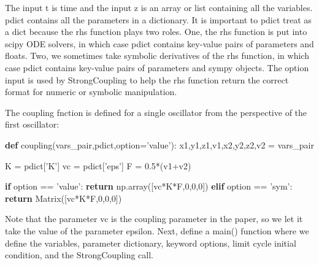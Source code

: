 \documentclass[
  english,
  a4paper,
  oneside]{article}
\newenvironment{Shaded}{}{}
\newcommand{\ControlFlowTok}[1]{\textcolor[rgb]{0.00,0.44,0.13}{\textbf{#1}}}
\newcommand{\DecValTok}[1]{\textcolor[rgb]{0.25,0.63,0.44}{#1}}
\newcommand{\FloatTok}[1]{\textcolor[rgb]{0.25,0.63,0.44}{#1}}
\newcommand{\KeywordTok}[1]{\textcolor[rgb]{0.00,0.44,0.13}{\textbf{#1}}}
\newcommand{\NormalTok}[1]{#1}
\newcommand{\OperatorTok}[1]{\textcolor[rgb]{0.40,0.40,0.40}{#1}}
\newcommand{\StringTok}[1]{\textcolor[rgb]{0.25,0.44,0.63}{#1}}
\begin{document}
The input t is time and the input z is an array or list containing all
the variables. pdict contains all the parameters in a dictionary. It is
important to pdict treat as a dict because the rhs function plays two
roles. One, the rhs function is put into scipy ODE solvers, in which
case pdict contains key-value pairs of parameters and floats. Two, we
sometimes take symbolic derivatives of the rhs function, in which case
pdict contains key-value pairs of parameters and sympy objects. The
option input is used by StrongCoupling to help the rhs function return
the correct format for numeric or symbolic manipulation.

The coupling fnction is defined for a single oscillator from the
perspective of the first oscillator:

\begin{Shaded}
\begin{Highlighting}[]
\KeywordTok{def}\NormalTok{ coupling(vars_pair,pdict,option}\OperatorTok{=}\StringTok{'value'}\NormalTok{):}
\NormalTok{    x1,y1,z1,v1,x2,y2,z2,v2 }\OperatorTok{=}\NormalTok{ vars_pair}
    
\NormalTok{    K }\OperatorTok{=}\NormalTok{ pdict[}\StringTok{'K'}\NormalTok{]}
\NormalTok{    vc }\OperatorTok{=}\NormalTok{ pdict[}\StringTok{'eps'}\NormalTok{]}
\NormalTok{    F }\OperatorTok{=} \FloatTok{0.5}\OperatorTok{*}\NormalTok{(v1}\OperatorTok{+}\NormalTok{v2)}
    
    \ControlFlowTok{if}\NormalTok{ option }\OperatorTok{==} \StringTok{'value'}\NormalTok{:}
        \ControlFlowTok{return}\NormalTok{ np.array([vc}\OperatorTok{*}\NormalTok{K}\OperatorTok{*}\NormalTok{F,}\DecValTok{0}\NormalTok{,}\DecValTok{0}\NormalTok{,}\DecValTok{0}\NormalTok{])}
    \ControlFlowTok{elif}\NormalTok{ option }\OperatorTok{==} \StringTok{'sym'}\NormalTok{:}
        \ControlFlowTok{return}\NormalTok{ Matrix([vc}\OperatorTok{*}\NormalTok{K}\OperatorTok{*}\NormalTok{F,}\DecValTok{0}\NormalTok{,}\DecValTok{0}\NormalTok{,}\DecValTok{0}\NormalTok{])}
\end{Highlighting}
\end{Shaded}

Note that the parameter vc is the coupling parameter in the paper, so we
let it take the value of the parameter epsilon. Next, define a main()
function where we define the variables, parameter dictionary, keyword
options, limit cycle initial condition, and the StrongCoupling call.
\end{document}
